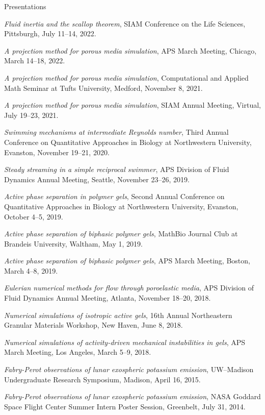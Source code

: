 \documentclass{cv}
\begin{document}
\begin{rSection}{Presentations}

	\textit{Fluid inertia and the scallop theorem}, SIAM Conference on the Life Sciences, Pittsburgh, July 11--14, 2022.

	\textit{A projection method for porous media simulation}, APS March Meeting, Chicago, March 14--18, 2022.

	\textit{A projection method for porous media simulation}, Computational and Applied Math Seminar at Tufts University, Medford, November 8, 2021.

	\textit{A projection method for porous media simulation}, SIAM Annual Meeting, Virtual, July 19--23, 2021.

	\textit{Swimming mechanisms at intermediate Reynolds number}, Third Annual Conference on Quantitative Approaches in Biology at Northwestern University, Evanston, November 19--21, 2020.

	\textit{Steady streaming in a simple reciprocal swimmer}, APS Division of Fluid Dynamics Annual Meeting, Seattle, November 23--26, 2019.

	\textit{Active phase separation in polymer gels}, Second Annual Conference on Quantitative Approaches in Biology at Northwestern University, Evanston, October 4--5, 2019.

	\textit{Active phase separation of biphasic polymer gels}, MathBio Journal Club at Brandeis University, Waltham, May 1, 2019.

	\textit{Active phase separation of biphasic polymer gels}, APS March Meeting, Boston, March 4--8, 2019.

	\textit{Eulerian numerical methods for flow through poroelastic media}, APS Division of Fluid Dynamics Annual Meeting, Atlanta, November 18--20, 2018.

	\textit{Numerical simulations of isotropic active gels}, 16th Annual Northeastern Granular Materials Workshop, New Haven, June 8, 2018.

	\textit{Numerical simulations of activity-driven mechanical instabilities in gels}, APS March Meeting, Los Angeles, March 5--9, 2018.

	\textit{Fabry-Perot observations of lunar exospheric potassium emission}, UW--Madison Undergraduate Research Symposium, Madison, April 16, 2015.

	\textit{Fabry-Perot observations of lunar exospheric potassium emission}, NASA Goddard Space Flight Center Summer Intern Poster Session, Greenbelt, July 31, 2014.
\end{rSection}
\end{document}
